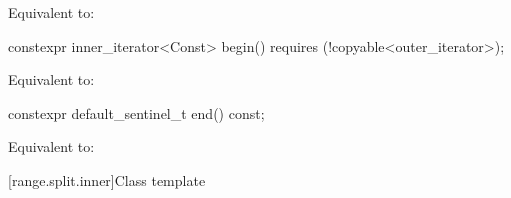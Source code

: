 \documentclass{wg21}
\begin{document}
\begin{itemdescr}
\pnum
\effects Equivalent to: 
\end{itemdescr}


\begin{addedblock}
\begin{itemdecl}
	constexpr inner_iterator<Const> begin() requires (!copyable<outer_iterator>);
\end{itemdecl}

\begin{itemdescr}
	\pnum
	\effects Equivalent to: 
\end{itemdescr}
\end{addedblock}

%
\begin{itemdecl}
constexpr default_sentinel_t end() const;
\end{itemdecl}

\begin{itemdescr}
\pnum
\effects Equivalent to: 
\end{itemdescr}

[range.split.inner]{Class template }
\end{document}
